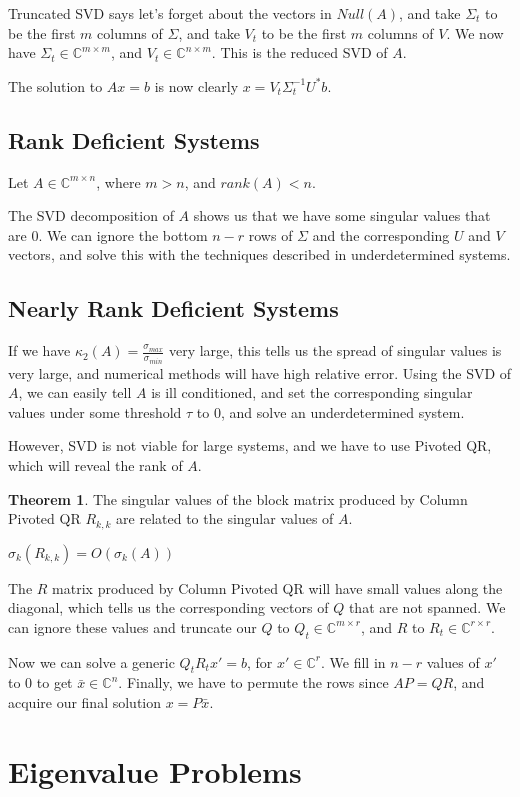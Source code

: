 \documentclass{article}
\theoremstyle{definition}
\newtheorem{theorem}{Theorem}
\begin{document}
Truncated SVD says let's forget about the vectors in $Null(A)$, and take $\Sigma_t$ to be the first $m$ columns of $\Sigma$, and take $V_t$ to be the first $m$ columns of $V$. We now have $\Sigma_t \in \mathbb{C}^{m \times m}$, and $V_t \in \mathbb{C}^{n \times m}$. This is the reduced SVD of $A$.

The solution to $Ax = b$ is now clearly $x = V_t \Sigma_t^{-1} U^* b$.

\subsection{Rank Deficient Systems}

Let $A \in \mathbb{C}^{m \times n}$, where $m > n$, and $rank(A) < n$.

The SVD decomposition of $A$ shows us that we have some singular values that are $0$. We can ignore the bottom $n-r$ rows of $\Sigma$ and the corresponding $U$ and $V$ vectors, and solve this with the techniques described in underdetermined systems.

\subsection{Nearly Rank Deficient Systems}

If we have $\kappa_2(A) = \frac{\sigma_{max}}{\sigma_{min}}$ very large, this tells us the spread of singular values is very large, and numerical methods will have high relative error. Using the SVD of $A$, we can easily tell $A$ is ill conditioned, and set the corresponding singular values under some threshold $\tau$ to $0$, and solve an underdetermined system.

However, SVD is not viable for large systems, and we have to use Pivoted QR, which will reveal the rank of $A$. \newline

\begin{theorem} The singular values of the block matrix produced by Column Pivoted QR $R_{k,k}$ are related to the singular values of $A$.

$\sigma_k(R_{k,k}) = O(\sigma_k(A))$

\end{theorem}

\vspace{3ex}
The $R$ matrix produced by Column Pivoted QR will have small values along the diagonal, which tells us the corresponding vectors of $Q$ that are not spanned. We can ignore these values and truncate our $Q$ to $Q_t \in \mathbb{C}^{m \times r}$, and $R$ to $R_t \in \mathbb{C}^{r \times r}$. 

Now we can solve a generic $Q_t R_t x' = b$, for $x' \in \mathbb{C}^{r}$. We fill in $n-r$ values of $x'$ to $0$ to get $\bar{x} \in \mathbb{C}^{n}$. Finally, we have to permute the rows since $A P = QR$, and acquire our final solution $x = P \bar{x}$.

\pagebreak

\section{Eigenvalue Problems}
\end{document}
